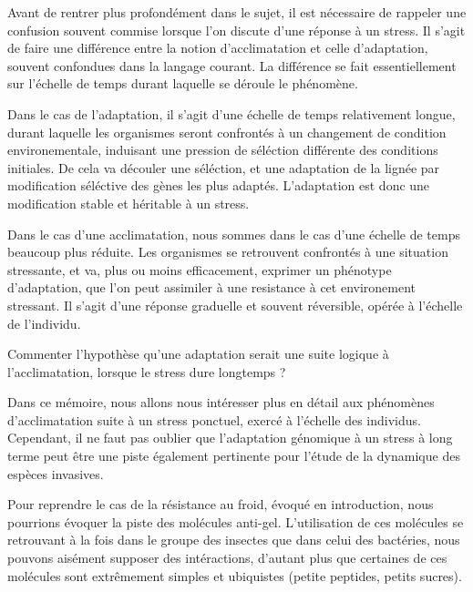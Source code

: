 Avant de rentrer plus profondément dans le sujet, il est nécessaire de
rappeler une confusion souvent commise lorsque l'on discute d'une réponse à un
stress. Il s'agit de faire une différence entre la notion d'acclimatation et
celle d'adaptation, souvent confondues dans la langage courant. La différence
se fait essentiellement sur l'échelle de temps durant laquelle se déroule le
phénomène.

Dans le cas de l'adaptation, il s'agit d'une échelle de temps relativement
longue, durant laquelle les organismes seront confrontés à un changement de
condition environementale, induisant une pression de séléction différente des
conditions initiales. De cela va découler une séléction, et une adaptation de
la lignée par modification séléctive des gènes les plus adaptés. L'adaptation
est donc une modification stable et héritable à un stress.

Dans le cas d'une acclimatation, nous sommes dans le cas d'une échelle de
temps beaucoup plus réduite. Les organismes se retrouvent confrontés à une
situation stressante, et va, plus ou moins efficacement, exprimer un phénotype
d'adaptation, que l'on peut assimiler à une resistance à cet environement
stressant. Il s'agit d'une réponse graduelle et souvent réversible, opérée à
l'échelle de l'individu.

\begin{note}
	Commenter l'hypothèse qu'une adaptation serait une suite logique à l'acclimatation, lorsque le stress dure longtemps ?
\end{note}


Dans ce mémoire, nous allons nous intéresser plus en détail aux phénomènes
d'acclimatation suite à un stress ponctuel, exercé à l'échelle des individus.
Cependant, il ne faut pas oublier que l'adaptation génomique à un stress à
long terme peut être une piste également pertinente pour l'étude de la
dynamique des espèces invasives.

Pour reprendre le cas de la résistance au froid, évoqué en introduction, nous
pourrions évoquer la piste des molécules anti-gel. L'utilisation de ces
molécules se retrouvant à la fois dans le groupe des insectes\cite{duman2001} que dans celui
des bactéries\cite{xu1998}, nous pouvons aisément supposer des intéractions, d'autant plus
que certaines de ces molécules sont extrêmement simples et ubiquistes (petite
peptides, petits sucres).
